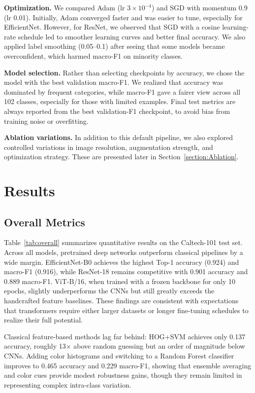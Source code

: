 \documentclass[11pt]{article}
\newcommand{\accEffb}{0.924}\newcommand{\macroEffb}{0.916}\newcommand{\wFOneEffb}{0.922}\newcommand{\topFiveEffb}{0.995}
\newcommand{\accRes}{0.901}\newcommand{\macroRes}{0.889}\newcommand{\wFOneRes}{0.900}\newcommand{\topFiveRes}{0.991}
\newcommand{\accHOG}{0.137}\newcommand{\macroHOG}{0.017}\newcommand{\wFOneHOG}{0.081}
\newcommand{\accRF}{0.465}\newcommand{\macroRF}{0.229}\newcommand{\wFOneRF}{0.394}
\begin{document}
\textbf{Optimization.} 
We compared Adam \cite{Kingma2015} (lr $3\times 10^{-4}$) and SGD with momentum 0.9 (lr 0.01). 
Initially, Adam converged faster and was easier to tune, especially for EfficientNet. 
However, for ResNet, we observed that SGD with a cosine learning-rate schedule \cite{Loshchilov2017} led to smoother learning curves and better final accuracy. 
We also applied label smoothing (0.05–0.1) \cite{Szegedy2016} after seeing that some models became overconfident, which harmed macro-F1 on minority classes.

\textbf{Model selection.} 
Rather than selecting checkpoints by accuracy, we chose the model with the best validation macro-F1. 
We realized that accuracy was dominated by frequent categories, while macro-F1 gave a fairer view across all 102 classes, especially for those with limited examples. 
Final test metrics are always reported from the best validation-F1 checkpoint, to avoid bias from training noise or overfitting.

\textbf{Ablation variations.} 
In addition to this default pipeline, we also explored controlled variations in image resolution, augmentation strength, and optimization strategy. 
These are presented later in Section~\ref{section:Ablation}.


\section{Results}
\subsection{Overall Metrics}
Table~\ref{tab:overall} summarizes quantitative results on the Caltech-101 test set.
Across all models, pretrained deep networks outperform classical pipelines by a wide margin.
EfficientNet-B0 achieves the highest Top-1 accuracy (\accEffb{}) and macro-F1 (\macroEffb{}),
while ResNet-18 remains competitive with \accRes{} accuracy and \macroRes{} macro-F1.
ViT-B/16, when trained with a frozen backbone for only 10 epochs, slightly underperforms the CNNs
but still greatly exceeds the handcrafted feature baselines.
These findings are consistent with expectations that transformers require either
larger datasets or longer fine-tuning schedules to realize their full potential.

Classical feature-based methods lag far behind: HOG+SVM achieves only \accHOG{} accuracy,
roughly 13$\times$ above random guessing but an order of magnitude below CNNs.
Adding color histograms and switching to a Random Forest classifier
improves to \accRF{} accuracy and \macroRF{} macro-F1, showing that
ensemble averaging and color cues provide modest robustness gains,
though they remain limited in representing complex intra-class variation.
\end{document}
